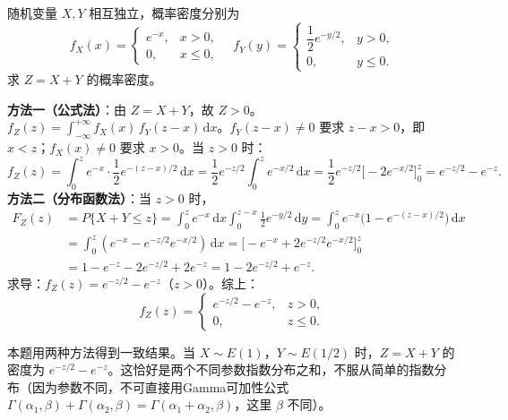 ﻿\documentclass[lang=cn,11pt]{elegantbook}
\begin{document}
\begin{exercise} \label{exer:3-12c}
随机变量 $X, Y$ 相互独立，概率密度分别为
\[
f_X(x) = \begin{cases} e^{-x}, & x > 0, \\ 0, & x \leqslant 0, \end{cases} \quad f_Y(y) = \begin{cases} \dfrac{1}{2}e^{-y/2}, & y > 0, \\ 0, & y \leqslant 0. \end{cases}
\]
求 $Z = X + Y$ 的概率密度。
\end{exercise}
\begin{solution}
\textbf{方法一（公式法）}：由 $Z = X+Y$，故 $Z > 0$。$f_Z(z) = \displaystyle\int_{-\infty}^{+\infty}f_X(x)\,f_Y(z-x)\,\mathrm{d}x$。$f_Y(z-x) \neq 0$ 要求 $z-x > 0$，即 $x < z$；$f_X(x) \neq 0$ 要求 $x > 0$。当 $z > 0$ 时：
\[
f_Z(z) = \int_0^z e^{-x} \cdot \frac{1}{2}e^{-(z-x)/2}\,\mathrm{d}x = \frac{1}{2}e^{-z/2}\int_0^z e^{-x/2}\,\mathrm{d}x = \frac{1}{2}e^{-z/2}\bigl[-2e^{-x/2}\bigr]_0^z = e^{-z/2} - e^{-z}.
\]
\textbf{方法二（分布函数法）}：当 $z > 0$ 时，
\begin{align*}
F_Z(z)& = P\{X+Y \leqslant z\} = \int_0^z e^{-x}\,\mathrm{d}x\int_0^{z-x}\frac{1}{2}e^{-y/2}\,\mathrm{d}y = \int_0^z e^{-x}\bigl(1-e^{-(z-x)/2}\bigr)\,\mathrm{d}x\\
&= \int_0^z(e^{-x} - e^{-z/2}e^{-x/2})\,\mathrm{d}x = \bigl[-e^{-x} + 2e^{-z/2}e^{-x/2}\bigr]_0^z \\
&= 1 - e^{-z} - 2e^{-z/2} + 2e^{-z} = 1 - 2e^{-z/2} + e^{-z}.
\end{align*}
求导：$f_Z(z) = e^{-z/2} - e^{-z}$（$z > 0$）。综上：
\[
f_Z(z) = \begin{cases} e^{-z/2} - e^{-z}, & z > 0, \\ 0, & z \leqslant 0. \end{cases}
\]
\begin{note}
本题用两种方法得到一致结果。当 $X \sim E(1)$，$Y \sim E(1/2)$ 时，$Z = X+Y$ 的密度为 $e^{-z/2} - e^{-z}$。这恰好是两个不同参数指数分布之和，不服从简单的指数分布（因为参数不同，不可直接用Gamma可加性公式 $\Gamma(\alpha_1,\beta) + \Gamma(\alpha_2,\beta) = \Gamma(\alpha_1+\alpha_2,\beta)$，这里 $\beta$ 不同）。
\end{note}
\end{solution}
\end{document}

